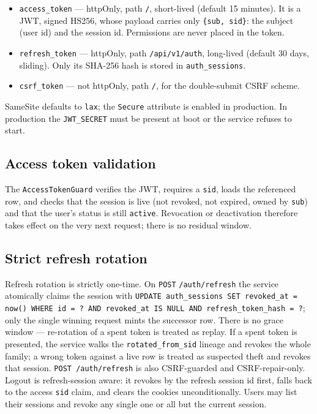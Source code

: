 \begin{itemize}
  \item \texttt{access\_token} --- httpOnly, path \texttt{/}, short-lived
  (default 15 minutes). It is a JWT, signed HS256, whose payload carries only
  \texttt{\{sub, sid\}}: the subject (user id) and the session id. Permissions
  are never placed in the token.
  \item \texttt{refresh\_token} --- httpOnly, path \texttt{/api/v1/auth},
  long-lived (default 30 days, sliding). Only its SHA-256 hash is stored in
  \texttt{auth\_sessions}.
  \item \texttt{csrf\_token} --- not httpOnly, path \texttt{/}, for the
  double-submit CSRF scheme.
\end{itemize}

\noindent SameSite defaults to \texttt{lax}; the \texttt{Secure} attribute is
enabled in production. In production the \texttt{JWT\_SECRET} must be present
at boot or the service refuses to start.

\subsection{Access token validation}

\noindent The \texttt{AccessTokenGuard} verifies the JWT, requires a
\texttt{sid}, loads the referenced \texttt{} row, and checks that
the session is live (not revoked, not expired, owned by \texttt{sub}) and that
the user's status is still \texttt{active}. Revocation or deactivation
therefore takes effect on the very next request; there is no residual window.

\subsection{Strict refresh rotation}

\noindent Refresh rotation is strictly one-time. On \texttt{POST}
\texttt{/auth/refresh} the service atomically claims the session with
\texttt{UPDATE auth\_sessions SET revoked\_at = now() WHERE id = ? AND
revoked\_at IS NULL AND refresh\_token\_hash = ?}; only the single winning
request mints the successor row. There is no grace window --- re-rotation of a
spent token is treated as replay. If a spent token is presented, the service
walks the \texttt{rotated\_from\_sid} lineage and revokes the whole family; a
wrong token against a live row is treated as suspected theft and revokes that
session. \texttt{POST /auth/refresh} is also CSRF-guarded and CSRF-repair-only.
Logout is refresh-session aware: it revokes by the refresh session id first,
falls back to the access \texttt{sid} claim, and clears the cookies
unconditionally. Users may list their sessions and revoke any single one or
all but the current session.

